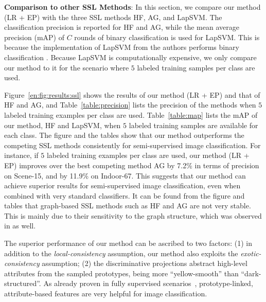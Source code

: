 \textbf{Comparison to other SSL Methods}: In this section, we compare
our method (LR + EP) with the three SSL methods HF, AG, and LapSVM.
The classification precision is reported for HF and AG, while the mean average
precision (mAP) of $C$ rounds of binary classification is used for
LapSVM. This is because the implementation of LapSVM from the authors 
performs binary classification \citep{Belkin:semiframe:2006}. Because LapSVM is computationally
expensive, we only compare our method to it for the scenario where $5$
labeled training samples per class are used.

Figure~\ref{en:fig:results:ssl} shows the results of our method (LR + EP)
and that of HF and AG, and Table~\ref{table:precision} lists the
precision of the methods when $5$ labeled training examples per class
are used. Table~\ref{table:map} lists the mAP of our method, HF and
LapSVM, when $5$ labeled training samples are available for each
class. The figure and the tables show that our method outperforms the
competing SSL methods consistently for semi-supervised image
classification.  For instance, if $5$ labeled training examples per
class are used, our method (LR + EP) improves over the best competing
method AG by 7.2\% in terms of precision on Scene-15, and by 11.9\% on
Indoor-67. This suggests that our method can achieve superior results
for semi-supervised image classification, even when combined with very
standard classifiers. It can be found from the figure and tables that
graph-based SSL methods such as HF and AG are not very stable. This is
mainly due to their sensitivity to the graph structure, which was
observed in \citep{nips14:ssl} as well.


The superior performance of our method can be ascribed to two factors: (1) in addition to the
\emph{local-consistency} assumption, our method also exploits the
\emph{exotic-consistency} assumption; (2) the discriminative
projections abstract high-level attributes from the sampled
prototypes, \eg being more ``yellow-smooth'' than
``dark-structured''.  As already proven in fully supervised
scenarios~\citep{ObjectAttribute:cvpr09, Transfer:CVPR:08},
prototype-linked, attribute-based features are very helpful for image
classification.  

